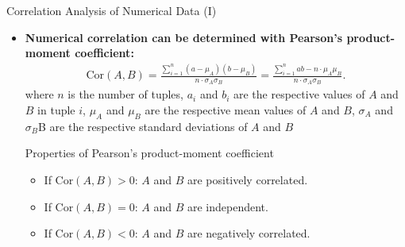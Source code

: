 \begin{frame}{Correlation Analysis of Numerical Data (I)}
	\begin{itemize}
		\item \textbf{Numerical correlation can be determined with
				      {\color{airforceblue}Pearson's product-moment coefficient}:}
		      \begin{align*}
			      \text{Cor}(A, B) = \frac{\sum_{i=1}^{n}
				      (a-\mu_{A})(b-\mu_{B})}{n\cdot\sigma_{A}\sigma_{B}} =
			      \frac{\sum_{i=1}^{n} ab -n\cdot\mu_{A}\mu_{B}}{n\cdot
				      \sigma_{A}\sigma_{B}}.
		      \end{align*}
		      where $n$ is the number of tuples, $a_i$ and $b_i$ are the
		      respective values of $A$ and $B$ in tuple $i$,
		      $\mu_A$ and $\mu_B$ are the respective mean values of $A$ and $B$,
		      $\sigma_{A}$ and $\sigma_{B}$B are the respective standard
		      deviations of $A$ and $B$
		      \begin{block}{Properties of Pearson's product-moment coefficient}
			      \begin{itemize}
				      \item If $\text{Cor}(A, B) > 0$: $A$ and $B$ are positively
				            correlated.
				      \item If $\text{Cor}(A, B) = 0$: $A$ and $B$ are independent.
				      \item If $\text{Cor}(A, B) < 0$: $A$ and $B$ are negatively
				            correlated.
			      \end{itemize}
		      \end{block}
	\end{itemize}
\end{frame}

